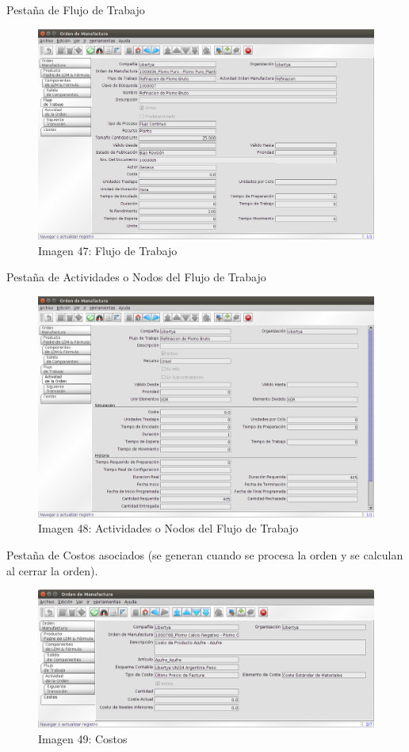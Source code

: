 \documentclass[letterpaper,10pt,spanish]{sphinxmanual}
\begin{document}
Pestaña de Flujo de Trabajo
\begin{figure}[htbp]
\centering
\capstart

\includegraphics{ly_om_4.png}
\caption{Imagen 47: Flujo de Trabajo}\end{figure}

Pestaña de Actividades o Nodos del Flujo de Trabajo
\begin{figure}[htbp]
\centering
\capstart

\includegraphics{ly_om_5.png}
\caption{Imagen 48: Actividades o Nodos del Flujo de Trabajo}\end{figure}

Pestaña de Costos asociados (se generan cuando se procesa la orden y se calculan al cerrar la orden).
\begin{figure}[htbp]
\centering
\capstart

\includegraphics{ly_om_6.png}
\caption{Imagen 49: Costos}\end{figure}
\end{document}
